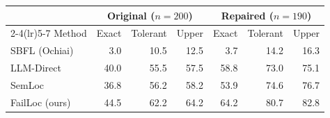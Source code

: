 \begin{tabular}{lrrrrrr}
\toprule
 & \multicolumn{3}{c}{Original ($n=200$)} & \multicolumn{3}{c}{Repaired ($n=190$)} \\
\cmidrule(lr){2-4}\cmidrule(lr){5-7}
Method & Exact & Tolerant & Upper & Exact & Tolerant & Upper \\
\midrule
SBFL (Ochiai) & 3.0 & 10.5 & 12.5 & 3.7 & 14.2 & 16.3 \\
LLM-Direct & 40.0 & 55.5 & 57.5 & 58.8 & 73.0 & 75.1 \\
SemLoc & 36.8 & 56.2 & 58.2 & 53.9 & 74.6 & 76.7 \\
FailLoc (ours) & 44.5 & 62.2 & 64.2 & 64.2 & 80.7 & 82.8 \\
\bottomrule
\end{tabular}
